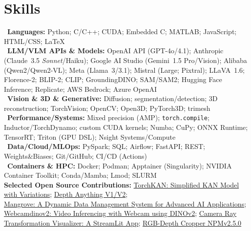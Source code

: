 \section*{Skills}

\textbullet~\textbf{Languages:} Python; C/C++; CUDA; Embedded C; MATLAB; JavaScript; HTML/CSS; \LaTeX\\
\textbullet~\textbf{LLM/VLM APIs \& Models:} OpenAI API (GPT\mbox{-}4o/4.1); Anthropic (Claude~3.5 \emph{Sonnet}/Haiku); Google AI Studio (Gemini~1.5 Pro/Vision); Alibaba (Qwen2/Qwen2\mbox{-}VL); Meta (Llama~3/3.1); Mistral (Large; Pixtral); LLaVA~1.6; Florence\mbox{-}2; BLIP\mbox{-}2; CLIP; GroundingDINO; SAM/SAM2; Hugging Face Inference; Replicate; AWS Bedrock; Azure OpenAI\\
\textbullet~\textbf{Vision \& 3D \& Generative:} Diffusion; segmentation/detection; 3D reconstruction; TorchVision; OpenCV; Open3D; PyTorch3D; trimesh\\
\textbullet~\textbf{Performance/Systems:} Mixed precision (AMP); \texttt{torch.compile}; Inductor/TorchDynamo; custom CUDA kernels; Numba; CuPy; ONNX Runtime; TensorRT; Triton (GPU DSL); Nsight Systems/Compute\\
\textbullet~\textbf{Data/Cloud/MLOps:} PySpark; SQL; Airflow; FastAPI; REST; Weights\&Biases; Git/GitHub; CI/CD (Actions)\\
\textbullet~\textbf{Containers \& HPC:} Docker; Podman; Apptainer (Singularity); NVIDIA Container Toolkit; Conda/Mamba; Lmod; SLURM\\

\textbf{Selected Open Source Contributions:} 
\href{https://github.com/1ssb/torchkan}{TorchKAN: Simplified KAN Model with Variations};
\href{https://github.com/LiheYoung/Depth-Anything}{Depth Anything V1/V2};  \\
\href{https://github.com/1ssb/mangroves}{Mangrove: A Dynamic Data Management System for Advanced AI Applications};
\href{https://github.com/1ssb/webcamdino}{Webcamdinov2: Video Inferencing with Webcam using DINOv2};
\href{https://github.com/1ssb/ray_visualizer}{Camera Ray Transformation Visualizer: A StreamLit App};
\href{https://github.com/1ssb/RGBD_cropper_tool}{RGB-Depth Cropper NPMv2.5.0}
